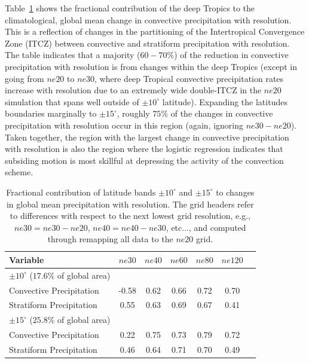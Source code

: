 \documentclass[times]{qjrms4}
\begin{document}
Table~\ref{tbl:table2} shows the fractional contribution of the deep Tropics to the climatological, global mean change in convective precipitation with resolution. This is a reflection of changes in the partitioning of the Intertropical Convergence Zone (ITCZ) between convective and stratiform precipitation with resolution. The table indicates that a majority ($60-70 \%$) of the reduction in convective precipitation with resolution is from changes within the deep Tropics (except in going from $ne20$ to $ne30$, where deep Tropical convective precipitation rates increase with resolution due to an extremely wide double-ITCZ in the $ne20$ simulation that spans well outside of $\pm 10^{\circ}$ latitude). Expanding the latitudes boundaries marginally to $\pm 15^{\circ}$, roughly $75\%$ of the changes in convective precipitation with resolution occur in this region (again, ignoring $ne30-ne20$). Taken together, the region with the largest change in convective precipitation with resolution is also the region where the logistic regression indicates that subsiding motion is most skillful at depressing the activity of the convection scheme.

 \begin{table}
 \caption{Fractional contribution of latitude bands $\pm 10^{\circ}$ and $\pm 15^{\circ}$ to changes in global mean precipitation with resolution. The grid headers refer to differences with respect to the next lowest grid resolution, e.g., $ne30 = ne30-ne20$, $ne40=ne40-ne30$, etc..., and computed through remapping all data to the $ne20$ grid.}
 \centering
 \scriptsize
 \begin{tabular}{lcccccc}
   \hline
   Variable & $ne30$ & $ne40$ & $ne60$ & $ne80$ & $ne120$ \\ 
   \hline
   $\pm 10^{\circ}$ ($17.6\%$ of global area) \\
   Convective Precipitation & -0.58 & 0.62 & 0.66 & 0.72 & 0.70 \\
   Stratiform Precipitation & 0.55 & 0.63 & 0.69 & 0.67 & 0.41 \\ 
   \hline
   $\pm 15^{\circ}$ ($25.8\%$ of global area) \\
   Convective Precipitation & 0.22 & 0.75 & 0.73 & 0.79 & 0.72 \\
   Stratiform Precipitation & 0.46 & 0.64 & 0.71 & 0.70 & 0.49 \\      
 \hline
 \end{tabular}
 \label{tbl:table2}
 \end{table}
\end{document}
